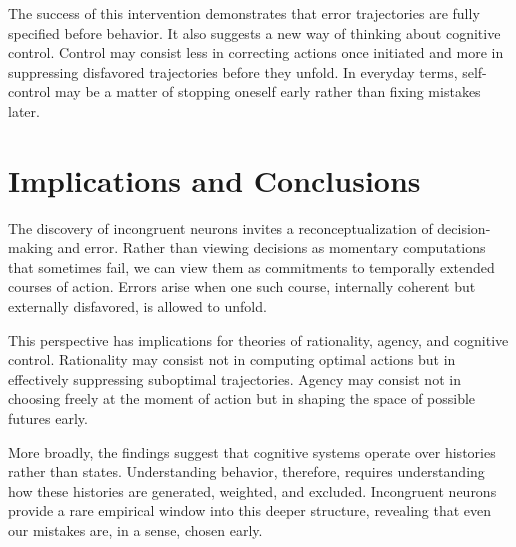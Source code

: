 \documentclass[11pt]{article}
\begin{document}
The success of this intervention demonstrates that error trajectories are fully specified before behavior. It also suggests a new way of thinking about cognitive control. Control may consist less in correcting actions once initiated and more in suppressing disfavored trajectories before they unfold. In everyday terms, self-control may be a matter of stopping oneself early rather than fixing mistakes later.

\section{Implications and Conclusions}

The discovery of incongruent neurons invites a reconceptualization of decision-making and error. Rather than viewing decisions as momentary computations that sometimes fail, we can view them as commitments to temporally extended courses of action. Errors arise when one such course, internally coherent but externally disfavored, is allowed to unfold.

This perspective has implications for theories of rationality, agency, and cognitive control. Rationality may consist not in computing optimal actions but in effectively suppressing suboptimal trajectories. Agency may consist not in choosing freely at the moment of action but in shaping the space of possible futures early.

More broadly, the findings suggest that cognitive systems operate over histories rather than states. Understanding behavior, therefore, requires understanding how these histories are generated, weighted, and excluded. Incongruent neurons provide a rare empirical window into this deeper structure, revealing that even our mistakes are, in a sense, chosen early.
\end{document}
